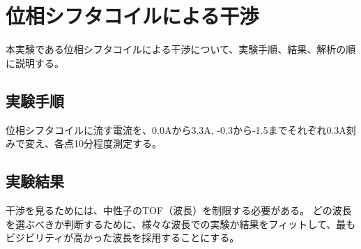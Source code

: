 \begingroup
\def\imgwidth{5.5cm}

\section{位相シフタコイルによる干渉}
本実験である位相シフタコイルによる干渉について、実験手順、結果、解析の順に説明する。

\subsection{実験手順}
位相シフタコイルに流す電流を、0.0Aから3.3A, -0.3から-1.5までそれぞれ0.3A刻みで変え、各点10分程度測定する。

\subsection{実験結果}
干渉を見るためには、中性子のTOF（波長）を制限する必要がある。
どの波長を選ぶべきか判断するために、様々な波長での実験か結果をフィットして、最もビジビリティが高かった波長を採用することにする。

